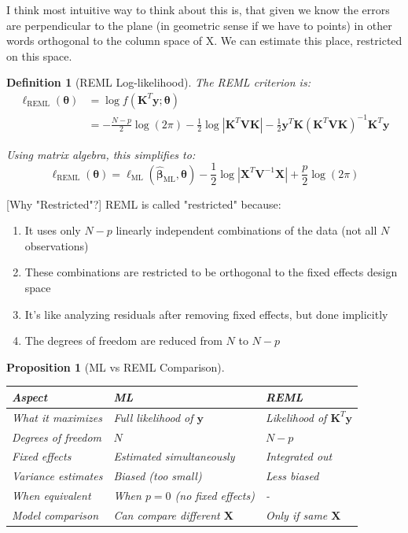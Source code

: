 \documentclass{article}
\newtheorem{definition}{Definition}
\newtheorem{proposition}{Proposition}
\begin{document}
I think most intuitive way to think about this is, that given we know the errors are perpendicular to the plane (in geometric sense if we have to points) in other words orthogonal to the column space of X. We can estimate this place, restricted on this space.

\begin{definition}[REML Log-likelihood]
The REML criterion is:
\begin{align}
\ell_{\text{REML}}(\boldsymbol{\theta}) &= \log f(\mathbf{K}^T\mathbf{y}; \boldsymbol{\theta}) \\
&= -\frac{N-p}{2}\log(2\pi) - \frac{1}{2}\log|\mathbf{K}^T\mathbf{V}\mathbf{K}| - \frac{1}{2}\mathbf{y}^T\mathbf{K}(\mathbf{K}^T\mathbf{V}\mathbf{K})^{-1}\mathbf{K}^T\mathbf{y}
\end{align}

Using matrix algebra, this simplifies to:
\begin{equation}
\ell_{\text{REML}}(\boldsymbol{\theta}) = \ell_{\text{ML}}(\hat{\boldsymbol{\beta}}_{\text{ML}}, \boldsymbol{\theta}) - \frac{1}{2}\log|\mathbf{X}^T\mathbf{V}^{-1}\mathbf{X}| + \frac{p}{2}\log(2\pi)
\end{equation}
\end{definition}

[Why "Restricted"?]
REML is called "restricted" because:
\begin{enumerate}
    \item It uses only $N-p$ linearly independent combinations of the data (not all $N$ observations)
    \item These combinations are restricted to be orthogonal to the fixed effects design space
    \item It's like analyzing residuals after removing fixed effects, but done implicitly
    \item The degrees of freedom are reduced from $N$ to $N-p$
\end{enumerate}


\begin{proposition}[ML vs REML Comparison]
\begin{center}
\begin{tabular}{|l|l|l|}
\hline
\textbf{Aspect} & \textbf{ML} & \textbf{REML} \\
\hline
What it maximizes & Full likelihood of $\mathbf{y}$ & Likelihood of $\mathbf{K}^T\mathbf{y}$ \\
\hline
Degrees of freedom & $N$ & $N-p$ \\
\hline
Fixed effects & Estimated simultaneously & Integrated out \\
\hline
Variance estimates & Biased (too small) & Less biased \\
\hline
When equivalent & When $p = 0$ (no fixed effects) & - \\
\hline
Model comparison & Can compare different $\mathbf{X}$ & Only if same $\mathbf{X}$ \\
\hline
\end{tabular}
\end{center}
\end{proposition}
\end{document}
